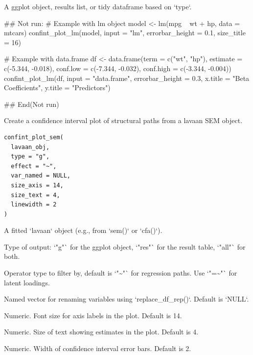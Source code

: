 \documentclass[a4paper]{book}
\begin{document}
%
\begin{Value}
A ggplot object, results list, or tidy dataframe based on `type`.
\end{Value}
%
\begin{Examples}
\begin{ExampleCode}
\#\# Not run: 
# Example with lm object
model <- lm(mpg ~ wt + hp, data = mtcars)
confint_plot_lm(model, input = "lm", errorbar_height = 0.1, size_title = 16)

# Example with data.frame
df <- data.frame(term = c("wt", "hp"), estimate = c(-5.344, -0.018),
                 conf.low = c(-7.344, -0.032), conf.high = c(-3.344, -0.004))
confint_plot_lm(df, input = "data.frame", errorbar_height = 0.3,
                x.title = "Beta Coefficients", y.title = "Predictors")

## End(Not run)
\end{ExampleCode}
\end{Examples}
%
\begin{Description}
Create a confidence interval plot of structural paths from a lavaan SEM object.
\end{Description}
%
\begin{Usage}
\begin{verbatim}
confint_plot_sem(
  lavaan_obj,
  type = "g",
  effect = "~",
  var_named = NULL,
  size_axis = 14,
  size_text = 4,
  linewidth = 2
)
\end{verbatim}
\end{Usage}
%
\begin{Arguments}
\begin{ldescription}
\item[\code{lavaan\_obj}] A fitted `lavaan` object (e.g., from `sem()` or `cfa()`).

\item[\code{type}] Type of output: `"g"` for the ggplot object, `"res"` for the result table, `"all"` for both.

\item[\code{effect}] Operator type to filter by, default is `"\textasciitilde{}"` for regression paths. Use `"=\textasciitilde{}"` for latent loadings.

\item[\code{var\_named}] Named vector for renaming variables using `replace\_df\_rep()`. Default is `NULL`.

\item[\code{size\_axis}] Numeric. Font size for axis labels in the plot. Default is 14.

\item[\code{size\_text}] Numeric. Size of text showing estimates in the plot. Default is 4.

\item[\code{linewidth}] Numeric. Width of confidence interval error bars. Default is 2.
\end{ldescription}
\end{Arguments}
\end{document}
